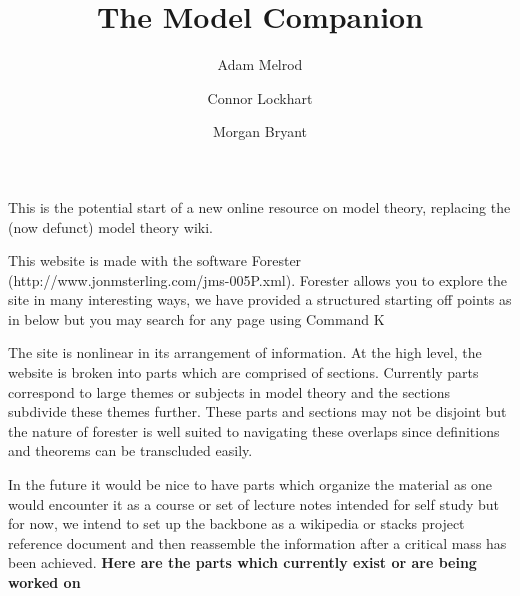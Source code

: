 \documentclass[a4paper]{article}
\title{The Model Companion}
\date{}
\author{Adam Melrod \and Connor Lockhart \and Morgan Bryant}
\begin{document}
\maketitle
\par{This is the potential start of a new online resource on model theory, replacing the (now defunct) model theory wiki.}\par{This website is made with the software Forester (http://www.jonmsterling.com/jms-005P.xml). Forester allows you to explore the site in many interesting ways, we have provided a structured starting off points as in below but you may search for any page using Command K}\par{The site is nonlinear in its arrangement of information. At the high level, the website is broken into parts which are comprised of sections. Currently parts correspond to large themes or subjects in model theory and the sections subdivide these themes further. These parts and sections may not be disjoint but the nature of forester is well suited to navigating these overlaps since definitions and theorems can be transcluded easily. }\par{In the future it would be nice to have parts which organize the material as one would encounter it as a course or set of lecture notes intended for self study but for now, we intend to set up the backbone as a wikipedia or stacks project reference document and then reassemble the information after a critical mass has been achieved. }\textbf{Here are the parts which currently exist or are being worked on}
  
\end{document}
